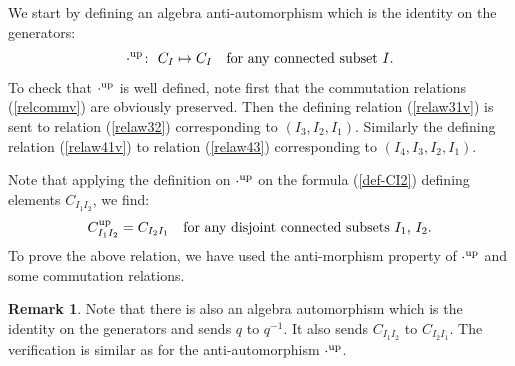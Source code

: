 \documentclass[10pt,a4paper]{amsart}
\numberwithin{equation}{section}
\theoremstyle{definition}
\newtheorem{rema}[theo]{Remark}
\begin{document}
We start by defining an algebra anti-automorphism which is the identity on the generators:
\begin{equation}\label{eq:up}
 {\cdot}^{\rm up}\colon \ C_I\mapsto C_I \quad \text{for any connected subset $I$} .
\end{equation}
To check that ${\cdot}^{\rm up}$ is well defined, note first that the commutation relations (\ref{relcommv}) are obviously preserved. Then the defining relation (\ref{relaw31v}) is sent to relation (\ref{relaw32}) corresponding to $(I_3,I_2,I_1)$. Similarly the defining relation (\ref{relaw41v}) to relation (\ref{relaw43}) corresponding to $(I_4,I_3,I_2,I_1)$.

Note that applying the definition on ${\cdot}^{\rm up}$ on the formula (\ref{def-CI2}) defining elements $C_{I_1I_2}$, we find:
\[C_{I_1I_2}^{\rm up}=C_{I_2I_1}\quad \text{for any disjoint connected subsets $I_1$, $I_2$.}\]
To prove the above relation, we have used the anti-morphism property of ${\cdot}^{\rm up}$ and some commutation relations.

\begin{rema}
Note that there is also an algebra automorphism which is the identity on the generators and sends $q$ to $q^{-1}$. It also sends $C_{I_1I_2}$ to $C_{I_2I_1}$. The verification is similar as for the anti-automorphism ${\cdot}^{\rm up}$.
\end{rema}
\end{document}
